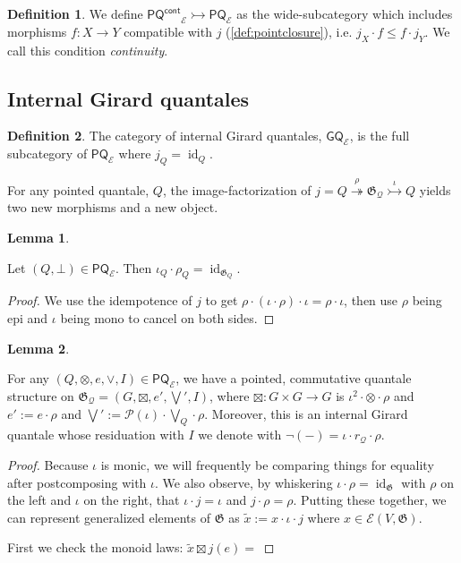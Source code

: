 \documentclass{article}
\makeatletter
\newcommand{\allproofs}{} %
\newif\ifproofsinappendix
\newcommand{\lemmawithproof}[3]{%
  \begin{lemma}\label{#1}
    #2  
    \ifproofsinappendix \hyperref[xxx#1]{(Proof)} \fi
  \end{lemma}
    \ifproofsinappendix
  \g@addto@macro\allproofs{%
    \par\medskip
    \noindent
    \subsection*{\cref{#1}}\par
    #2\par
    \begin{proof}\label{xxx#1}
      #3
    \end{proof}%
  }
      \else

    \begin{proof}
      #3
    \end{proof}
    \fi 
}
\theoremstyle{definition}
\newtheorem{definition}{Definition}[section]
\newtheorem{lemma}{Lemma}[section]
\newcommand{\G}{\mathfrak{G}}
\newcommand{\cE}{\mathcal{E}}
\newcommand{\cP}{\mathcal{P}}
\newcommand{\cQ}{\mathcal{Q}}
\newcommand{\cat}[1]{\mathsf{#1}}
\newcommand{\id}{\operatorname{id}}
\makeatother
\begin{document}
\begin{definition}
    We define $\cat{PQ^{cont}}_\cE\rightarrowtail \cat{PQ}_\cE$ as the wide-subcategory which includes morphisms $f\colon X\to Y$ compatible with $j$ (\cref{def:pointclosure}), i.e. $j_X\cdot f \leq f\cdot j_Y$. 
    We call this condition {\it continuity}.
\end{definition}

\subsection{Internal Girard quantales}
\begin{definition}
    The category of internal Girard quantales, $\cat{GQ}_\cE$, is the full subcategory of $\cat{PQ}_\cE$ where $j_Q=\id_Q$.
\end{definition}

For any pointed quantale, $Q$, the image-factorization of $j = Q \overset{\rho}\twoheadrightarrow \G_\cQ \overset{\iota}\rightarrowtail Q$ yields two new morphisms and a new object.

\lemmawithproof{lemma:iotarho}{
    Let $(Q,\bot)\in \cat{PQ}_\cE$. Then $\iota_Q\cdot \rho_Q=\id_{\G_Q}$.
}{
We use the idempotence of $j$ to get $\rho\cdot (\iota\cdot \rho)\cdot \iota = \rho\cdot \iota$, then use $\rho$ being epi and $\iota$ being mono to cancel on both sides. 
}

\lemmawithproof{lemma:gqquant}{
    For any $(Q,\otimes, e, \vee, I) \in \cat{PQ_\cE}$, we have a pointed, commutative quantale structure on $\G_\cQ=(G,\boxtimes,e',\bigvee', I)$, where $\boxtimes\colon G\times G\to G$ is $\iota^2\cdot \otimes \cdot \rho$ and $e':=e\cdot \rho$ and $\bigvee':=\cP(\iota)\cdot \bigvee_Q \cdot \rho$. Moreover, this is an internal Girard quantale whose residuation with $I$ we denote with $\neg(-)=\iota\cdot r_\cQ \cdot\rho$.
}{
    Because $\iota$ is monic, we will frequently be comparing things for equality after postcomposing with $\iota$.
    We also observe, by whiskering $\iota\cdot \rho=\id_{\G}$ with $\rho$ on the left and $\iota$ on the right, that $\iota\cdot j=\iota$ and $j\cdot \rho = \rho$. Putting these together, we can represent generalized elements of $\G$ as $\tilde{x}:= x \cdot \iota \cdot j$ where $x \in \cE(V,\G)$.

    First we check the monoid laws: $\tilde{x}\boxtimes j(e) =  $
}
\end{document}
